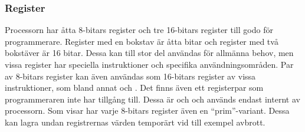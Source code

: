 \documentclass[main.tex]{subfiles}
\begin{document}
\subsubsection{Register}
Processorn har åtta 8-bitars register och tre 16-bitars register till godo för
programmerare. Register med en bokstav är åtta bitar och register med två
bokstäver är 16 bitar. Dessa kan till stor del användas för allmänna behov, men
vissa register har speciella instruktioner och specifika användningsområden.
Par av 8-bitars register kan även användas som 16-bitars register av vissa
instruktioner, som bland annat  och . Det finns
även ett registerpar som programmeraren inte har tillgång till. Dessa är
 och  och används endast internt av processorn. Som
 visar har varje 8-bitars register även en ``prim''-variant.
Dessa kan lagra undan registrernas värden temporärt vid till exempel avbrott.
\end{document}
